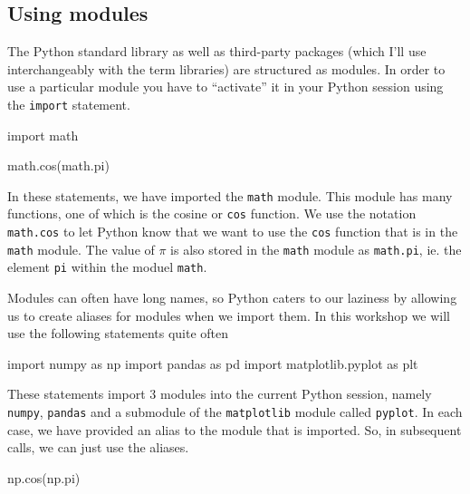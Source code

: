 \documentclass[
  letterpaper,
]{scrbook}
\newenvironment{Shaded}{\begin{snugshade}}{\end{snugshade}}
\newcommand{\ImportTok}[1]{#1}
\newcommand{\NormalTok}[1]{#1}
\begin{document}
\hypertarget{using-modules}{%
\subsection{Using modules}\label{using-modules}}

The Python standard library as well as third-party packages (which I'll use interchangeably with the term libraries) are structured as modules. In order to use a particular module you have to ``activate'' it in your Python session using the \texttt{import} statement.

\begin{Shaded}
\begin{Highlighting}[]
\ImportTok{import}\NormalTok{ math}

\NormalTok{math.cos(math.pi)}
\end{Highlighting}
\end{Shaded}

In these statements, we have imported the \texttt{math} module. This module has many functions, one of which is the cosine or \texttt{cos} function. We use the notation \texttt{math.cos} to let Python know that we want to use the \texttt{cos} function that is in the \texttt{math} module. The value of \(\pi\) is also stored in the \texttt{math} module as \texttt{math.pi}, ie. the element \texttt{pi} within the moduel \texttt{math}.

Modules can often have long names, so Python caters to our laziness by allowing us to create aliases for modules when we import them. In this workshop we will use the following statements quite often

\begin{Shaded}
\begin{Highlighting}[]
\ImportTok{import}\NormalTok{ numpy }\ImportTok{as}\NormalTok{ np}
\ImportTok{import}\NormalTok{ pandas }\ImportTok{as}\NormalTok{ pd}
\ImportTok{import}\NormalTok{ matplotlib.pyplot }\ImportTok{as}\NormalTok{ plt}
\end{Highlighting}
\end{Shaded}

These statements import 3 modules into the current Python session, namely \texttt{numpy}, \texttt{pandas} and a submodule of the \texttt{matplotlib} module called \texttt{pyplot}. In each case, we have provided an alias to the module that is imported. So, in subsequent calls, we can just use the aliases.

\begin{Shaded}
\begin{Highlighting}[]
\NormalTok{np.cos(np.pi)}
\end{Highlighting}
\end{Shaded}
\end{document}
